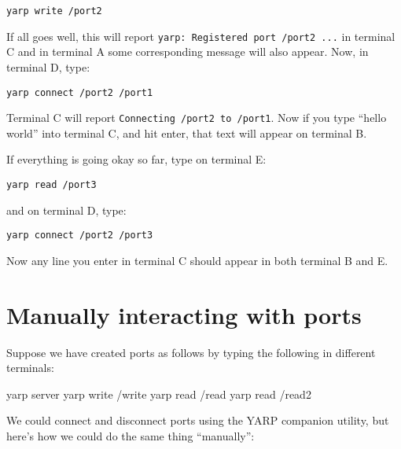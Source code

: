 \documentclass[a4]{article}
\newcommand{\ctt}[1]{{\tt #1}}
\begin{document}
\begin{verbatim}
yarp write /port2
\end{verbatim}

If all goes well, this will report \ctt{yarp: Registered port /port2 ...} in
terminal C and in terminal A some corresponding message will also
appear.
%
Now, in terminal D, type:

\begin{verbatim}
yarp connect /port2 /port1
\end{verbatim}

Terminal C will report \ctt{Connecting /port2 to /port1}.  Now if
you type ``hello world'' into terminal C, and hit enter, that text
will appear on terminal B.


If everything is going okay so far, type on terminal E:
%
\begin{verbatim}
yarp read /port3
\end{verbatim}
%
and on terminal D, type:
%
\begin{verbatim}
yarp connect /port2 /port3
\end{verbatim}
%
Now any line you enter in terminal C should appear in both terminal B and E.

\section{Manually interacting with ports}

Suppose we have created ports as follows by typing the
following in different terminals:
\begin{code}
  yarp server
  yarp write /write
  yarp read /read
  yarp read /read2
\end{code}
%
We could connect and disconnect ports using the YARP companion
utility, but here's how we could do the same thing ``manually'':
\end{document}
